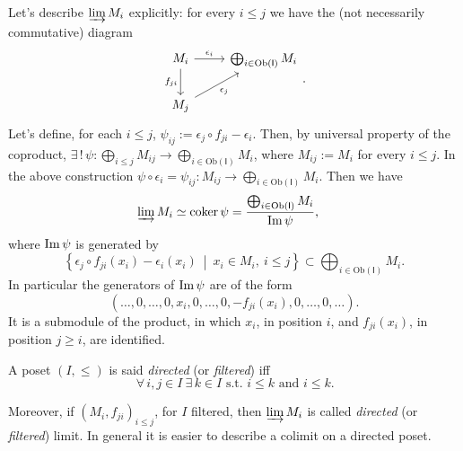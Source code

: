 \begin{ex}
	Let's describe $\varinjlim M_i$ explicitly: for every $i \leq j$ we have the (not necessarily commutative) diagram
	\begin{equation}
	\begin{tikzcd}
		M_i \arrow[r, "\epsilon_i", rightarrow] \arrow[d, "f_{ji}"', rightarrow] &
		\bigoplus_{i \in \mathrm{Ob} \left(\mathsf{I}\right)} M_i \\
		M_j \arrow[ru, "\epsilon_j"', rightarrow] & 
	\end{tikzcd} 
	.\end{equation}
	Let's define, for each $i \leq j$, $\psi_{ij} := \epsilon_j \circ f_{ji} - \epsilon_i$.
	Then, by universal property of the coproduct,
	$\exists\, !\, \psi: \bigoplus_{i \leq j} M_{ij} \to \bigoplus_{i \in \mathrm{Ob} \left(\mathsf{I}\right)} M_{i}$,
	where $M_{ij} := M_i$ for every $i \leq j$.
	In the above construction $\psi \circ \epsilon_i = \psi_{ij}: M_{ij} \to \bigoplus_{i \in \mathrm{Ob} \left(\mathsf{I}\right)} M_i$.
	Then we have
	\begin{align}
		\varinjlim M_i &\simeq \operatorname{coker} \psi =
		\frac{\bigoplus_{i \in \mathrm{Ob} \left(\mathsf{I}\right)} M_i}{\operatorname{Im} \psi}
	,\end{align}
	where $\operatorname{Im} \psi$ is generated by
	\begin{equation}
		\left\{ \epsilon_j \circ f_{ji}(x_i) - \epsilon_i(x_i) \ \middle|\ 
		x_i \in M_i,\ i \leq j \right\} \subset
		\bigoplus_{i \in \mathrm{Ob} \left(\mathsf{I}\right)} M_i
	.\end{equation} 
	In particular the generators of $\operatorname{Im} \psi$ are of the form
	\begin{equation}
		\left( \ldots, 0, \ldots, 
		0, x_i, 0, \ldots, 0, - f_{ji}(x_i),
		0, \ldots, 0, \ldots \right)
	.\end{equation} 	
	It is a submodule of the product, in which $x_i$, in position $i$,
	and $f_{ji}(x_i)$, in position $j \geq i$, are identified.
\end{ex}

\begin{defn}
	A poset $\left(I, \leq \right)$ is said {\em directed} (or {\em filtered}) iff
	\begin{equation}
	\,\forall\,  i, j \in I \ \exists\, k \in I \text{ s.t. } i \leq k \text{ and } i \leq k
	.\end{equation} 
\end{defn}
Moreover, if $\left(M_i, f_{ji}\right)_{i \leq j}$, for $I$ filtered, then $\varinjlim M_i$ is called
{\em directed} (or {\em filtered}) limit.
In general it is easier to describe a colimit on a directed poset.

